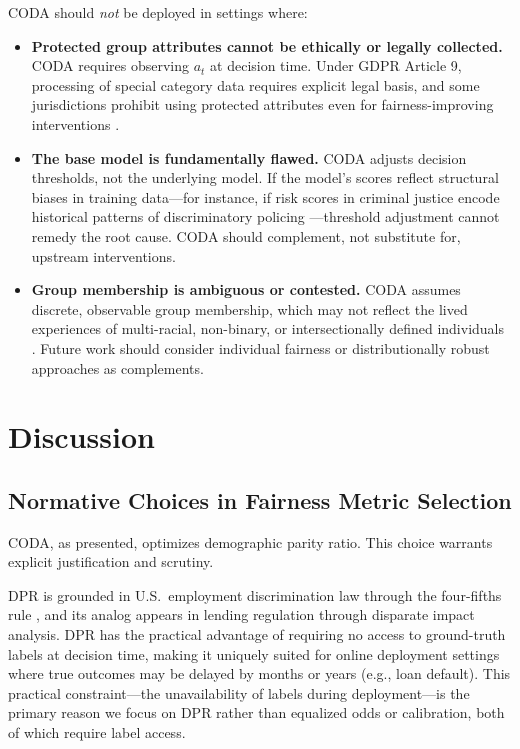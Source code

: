 \documentclass[letterpaper]{article} %
\theoremstyle{definition}
\begin{document}
CODA should \emph{not} be deployed in settings where:
\begin{itemize}
    \item \textbf{Protected group attributes cannot be ethically or legally collected.} CODA requires observing $a_t$ at decision time. Under GDPR Article 9, processing of special category data requires explicit legal basis, and some jurisdictions prohibit using protected attributes even for fairness-improving interventions \cite{wachter2021bias}.
    \item \textbf{The base model is fundamentally flawed.} CODA adjusts decision thresholds, not the underlying model. If the model's scores reflect structural biases in training data---for instance, if risk scores in criminal justice encode historical patterns of discriminatory policing \cite{angwin2016machine}---threshold adjustment cannot remedy the root cause. CODA should complement, not substitute for, upstream interventions.
    \item \textbf{Group membership is ambiguous or contested.} CODA assumes discrete, observable group membership, which may not reflect the lived experiences of multi-racial, non-binary, or intersectionally defined individuals \cite{crenshaw1989demarginalizing,buolamwini2018gender}. Future work should consider individual fairness \cite{dwork2012fairness} or distributionally robust approaches as complements.
\end{itemize}

\section{Discussion}
\label{sec:discussion}

\subsection{Normative Choices in Fairness Metric Selection}
\label{sec:normative}

CODA, as presented, optimizes demographic parity ratio. This choice warrants explicit justification and scrutiny.

DPR is grounded in U.S.\ employment discrimination law through the four-fifths rule \cite{biddle2006adverse}, and its analog appears in lending regulation through disparate impact analysis. DPR has the practical advantage of requiring no access to ground-truth labels at decision time, making it uniquely suited for online deployment settings where true outcomes may be delayed by months or years (e.g., loan default). This practical constraint---the unavailability of labels during deployment---is the primary reason we focus on DPR rather than equalized odds or calibration, both of which require label access.
\end{document}
